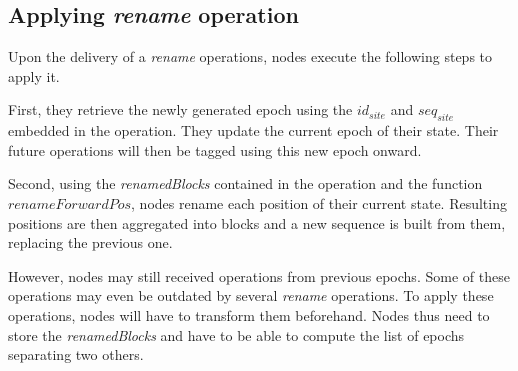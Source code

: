 \documentclass{article}
\theoremstyle{definition}
\begin{document}

\subsection{Applying \emph{rename} operation}

Upon the delivery of a \emph{rename} operations, nodes execute the following steps to apply it.

First, they retrieve the newly generated epoch using the $id_{site}$ and $seq_{site}$ embedded in the operation.
They update the current epoch of their state.
Their future operations will then be tagged using this new epoch onward.

Second, using the \emph{renamedBlocks} contained in the operation and the function $renameForwardPos$, nodes rename each position of their current state.
Resulting positions are then aggregated into blocks and a new sequence is built from them, replacing the previous one.

However, nodes may still received operations from previous epochs.
Some of these operations may even be outdated by several \emph{rename} operations.
To apply these operations, nodes will have to transform them beforehand.
Nodes thus need to store the \emph{renamedBlocks} and have to be able to compute the list of epochs separating two others.
\end{document}
